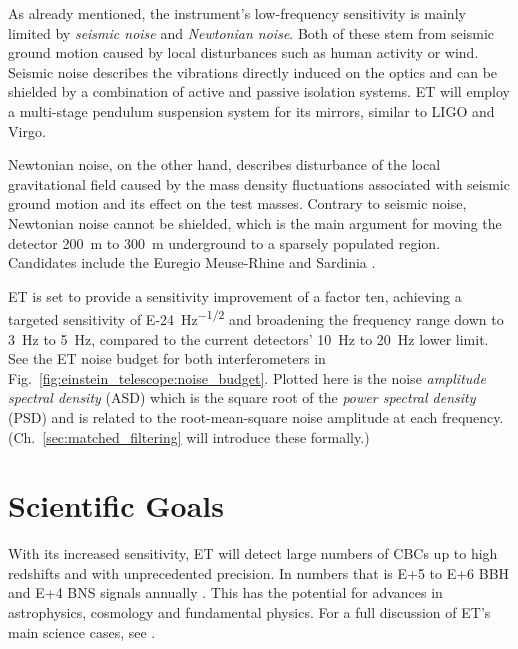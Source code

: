 As already mentioned, the instrument's low-frequency sensitivity is mainly limited by \emph{seismic noise} and \emph{Newtonian noise}. Both of these stem from seismic ground motion caused by local disturbances such as human activity or wind. Seismic noise describes the vibrations directly induced on the optics and can be shielded by a combination of active and passive isolation systems. ET will employ a multi-stage pendulum suspension system for its mirrors, similar to LIGO and Virgo.

Newtonian noise, on the other hand, describes disturbance of the local gravitational field caused by the mass density fluctuations associated with seismic ground motion and its effect on the test masses. Contrary to seismic noise, Newtonian noise cannot be shielded, which is the main argument for moving the detector \SI{200}{\meter} to \SI{300}{\meter} underground to a sparsely populated region. Candidates include the Euregio Meuse-Rhine and Sardinia \cite{etcandidates}.

ET is set to provide a sensitivity improvement of a factor ten, achieving a targeted sensitivity of \SI{E-24}{\hertz^{-1/2}} and broadening the frequency range down to \SI{3}{\hertz} to \SI{5}{\hertz}, compared to the current detectors' \SI{10}{\hertz} to \SI{20}{\hertz} lower limit.
See the ET noise budget for both interferometers in Fig.~\ref{fig:einstein_telescope:noise_budget}. Plotted here is the noise \emph{amplitude spectral density} (ASD) which is the square root of the \emph{power spectral density} (PSD) and is related to the root-mean-square noise amplitude at each frequency. (Ch.~\ref{sec:matched_filtering} will introduce these formally.)

\section{Scientific Goals}
 
 
With its increased sensitivity, ET will detect large numbers of CBCs up to high redshifts and with unprecedented precision. In numbers that is \SI{E+5}{\nothing} to \SI{E+6}{\nothing} BBH and \SI{E+4}{\nothing} BNS signals annually \cite{abac2025scienceeinsteintelescope}. This has the potential for advances in astrophysics, cosmology and fundamental physics. For a full discussion of ET's main science cases, see \cite{ET-0007C-20, abac2025scienceeinsteintelescope}.

